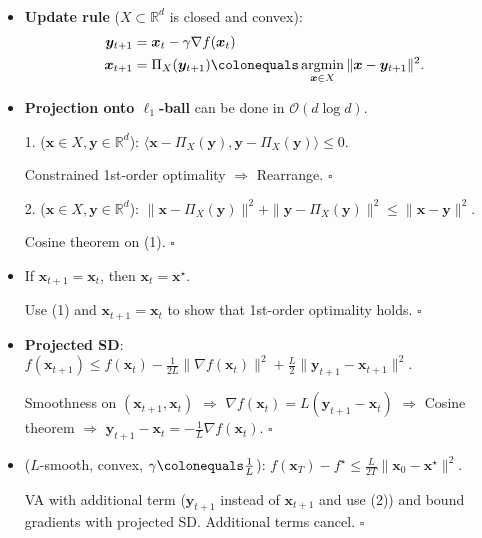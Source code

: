 \documentclass[8pt,a4paper]{extarticle}
\renewcommand{\proof}[1]{\begin{tcolorbox}#1 \hfill $\square$\end{tcolorbox}}
\DeclareMathOperator*{\argmin}{argmin}
\newcommand{\R}{\mathbb{R}}
\renewcommand{\vec}[1]{\bm{#1}}
\newenvironment{topic}[1]
{\textbf{\sffamily \colorbox{black}{\rlap{\textbf{\textcolor{white}{#1}}}\hspace{\linewidth}\hspace{-2\fboxsep}}} \\ \vspace{0.2cm}}
{}
\begin{document}
\begin{multicols*}{2}
    \begin{topic}{Projected gradient descent}
        \begin{itemize}
            \item \textbf{Update rule} ($X \subset \R^d$ is closed and convex):
                  \begin{align*}
                      \vec{y}_{t+1} & = \vec{x}_t - \gamma \nabla f(\vec{x}_t)                                                     \\
                      \vec{x}_{t+1} & = \Pi_X(\vec{y}_{t+1}) \colonequals \argmin_{\vec{x} \in X} \| \vec{x} - \vec{y}_{t+1} \|^2.
                  \end{align*}
            \item \textbf{Projection onto $\ell_1$-ball} can be done in $\mathcal{O}(d \log d)$.
            \item[1.] ($\vec{x} \in X, \vec{y} \in \R^d$): $\langle \vec{x} - \Pi_X(\vec{y}), \vec{y} - \Pi_X(\vec{y}) \rangle \leq 0$.
                  \proof{Constrained 1st-order optimality $\Rightarrow$ Rearrange.}
            \item[2.] ($\vec{x} \in X, \vec{y} \in \R^d$): $\| \vec{x} - \Pi_X(\vec{y}) \|^2 + \| \vec{y} - \Pi_X(\vec{y}) \|^2 \leq \| \vec{x} - \vec{y} \|^2$.
                  \proof{Cosine theorem on (1).}
            \item If $\vec{x}_{t+1} = \vec{x}_t$, then $\vec{x}_t = \vec{x}^\star$. \proof{Use (1) and $\vec{x}_{t+1}
                          = \vec{x}_t$ to show that 1st-order optimality holds.}
            \item \textbf{Projected SD}: $f(\vec{x}_{t+1}) \leq f(\vec{x}_t) - \frac{1}{2L} \| \nabla f(\vec{x}_t) \|^2 + \frac{L}{2} \| \vec{y}_{t+1} - \vec{x}_{t+1} \|^2$.
                  \proof{Smoothness on $(\vec{x}_{t+1}, \vec{x}_t)$ $\Rightarrow$ $\nabla f(\vec{x}_t) = L(\vec{y}_{t+1} - \vec{x}_t)$ $\Rightarrow$ Cosine theorem $\Rightarrow$ $\vec{y}_{t+1} - \vec{x}_t = -\frac{1}{L} \nabla f(\vec{x}_t)$.}
            \item ($L$-smooth, convex, $\gamma \colonequals \frac{1}{L}$): $f(\vec{x}_T) - f^\star \leq \frac{L}{2T} \| \vec{x}_0 - \vec{x}^\star \|^2$.
                  \proof{VA with additional term ($\vec{y}_{t+1}$ instead of $\vec{x}_{t+1}$ and use (2)) and bound gradients with projected SD. Additional terms cancel.}
        \end{itemize}
    \end{topic}


\end{multicols*}
\end{document}
